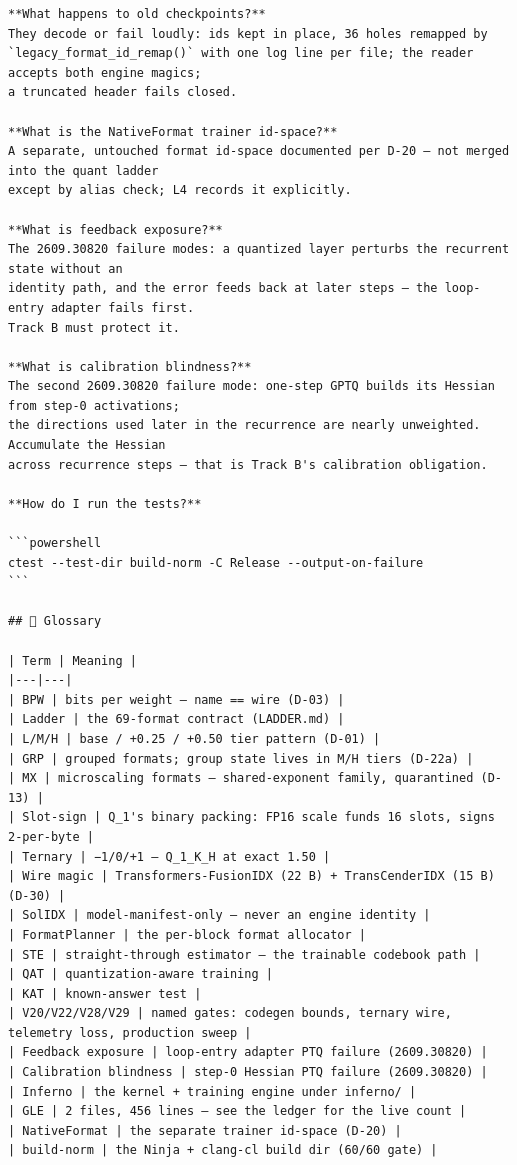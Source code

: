 \begin{Verbatim}[breaklines,breakanywhere,fontsize=\footnotesize]
**What happens to old checkpoints?**
They decode or fail loudly: ids kept in place, 36 holes remapped by
`legacy_format_id_remap()` with one log line per file; the reader accepts both engine magics;
a truncated header fails closed.

**What is the NativeFormat trainer id-space?**
A separate, untouched format id-space documented per D-20 — not merged into the quant ladder
except by alias check; L4 records it explicitly.

**What is feedback exposure?**
The 2609.30820 failure modes: a quantized layer perturbs the recurrent state without an
identity path, and the error feeds back at later steps — the loop-entry adapter fails first.
Track B must protect it.

**What is calibration blindness?**
The second 2609.30820 failure mode: one-step GPTQ builds its Hessian from step-0 activations;
the directions used later in the recurrence are nearly unweighted. Accumulate the Hessian
across recurrence steps — that is Track B's calibration obligation.

**How do I run the tests?**

```powershell
ctest --test-dir build-norm -C Release --output-on-failure
```

## 📖 Glossary

| Term | Meaning |
|---|---|
| BPW | bits per weight — name == wire (D-03) |
| Ladder | the 69-format contract (LADDER.md) |
| L/M/H | base / +0.25 / +0.50 tier pattern (D-01) |
| GRP | grouped formats; group state lives in M/H tiers (D-22a) |
| MX | microscaling formats — shared-exponent family, quarantined (D-13) |
| Slot-sign | Q_1's binary packing: FP16 scale funds 16 slots, signs 2-per-byte |
| Ternary | −1/0/+1 — Q_1_K_H at exact 1.50 |
| Wire magic | Transformers-FusionIDX (22 B) + TransCenderIDX (15 B) (D-30) |
| SolIDX | model-manifest-only — never an engine identity |
| FormatPlanner | the per-block format allocator |
| STE | straight-through estimator — the trainable codebook path |
| QAT | quantization-aware training |
| KAT | known-answer test |
| V20/V22/V28/V29 | named gates: codegen bounds, ternary wire, telemetry loss, production sweep |
| Feedback exposure | loop-entry adapter PTQ failure (2609.30820) |
| Calibration blindness | step-0 Hessian PTQ failure (2609.30820) |
| Inferno | the kernel + training engine under inferno/ |
| GLE | 2 files, 456 lines — see the ledger for the live count |
| NativeFormat | the separate trainer id-space (D-20) |
| build-norm | the Ninja + clang-cl build dir (60/60 gate) |


\end{Verbatim}
